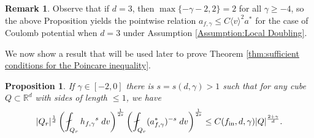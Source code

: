\documentclass[12pt,american]{amsart}
\numberwithin{equation}{section}
\theoremstyle{plain}
\newtheorem{prop}[thm]{Proposition}
\theoremstyle{definition}                  %
\newtheorem{rem}[thm]{Remark}
\def\astar{{a^*}}
\def\fin{f_{\textnormal{in}}}
\begin{document}
\begin{rem}
  Observe that if $d=3$, then $\max\{-\gamma-2,2\} =2$ for all $\gamma \geq -4$, so the above Proposition yields the pointwise  relation $a_{f,\gamma}\leq C\langle v\rangle^2 \astar$ for the case of Coulomb potential when $d=3$ under Assumption \ref{Assumption:Local Doubling}.
\end{rem}

We now show a result that will be used later to prove Theorem \ref{thm:sufficient conditions for the Poincare inequality}. 
\begin{prop}\label{new_pro_global_space}
  If $\gamma \in [-2,0]$ there is $s=s(d,\gamma) >1$ such that for any cube $Q \subset \mathbb{R}^d$ with sides of length $\leq 1$, we have
  \begin{align*}
    |Q_r|^{\frac{1}{d}} \left( \fint_{Q_r}{h_{f,\gamma}}^{s}\;dv\right)^{\frac{1}{2s}}\left(\fint_{Q_r}(a_{f,\gamma}^*)^{-s}\;dv\right)^{\frac{1}{2s}} \le C(\fin,d,\gamma) |Q|^{\frac{2+\gamma}{d}}.
  \end{align*}	
\end{prop}
\end{document}
